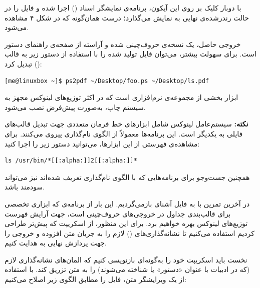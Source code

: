 با دوبار کلیک بر روی این آیکون، برنامه‌ی نمایشگر اسناد () اجرا شده و فایل را در حالت رندرشده‌ی نهایی به نمایش می‌گذارد؛ درست همان‌گونه که در شکل ۴ مشاهده می‌شود.


خروجی حاصل، یک نسخه‌ی حروف‌چینی شده و آراسته از صفحه‌ی راهنمای دستور  است. برای سهولت بیشتر، می‌توان فایل  تولید شده را با استفاده از دستور زیر به قالب  () تبدیل کرد:

\begin{latin}
\begin{lstlisting}
[me@linuxbox ~]$ ps2pdf ~/Desktop/foo.ps ~/Desktop/ls.pdf
\end{lstlisting}
\end{latin}

ابزار  بخشی از مجموعه‌ی نرم‌افزاری  است که در اکثر توزیع‌های لینوکس مجهز به سیستم چاپ، به‌صورت پیش‌فرض نصب می‌شود.

\begin{note}
\textbf{نکته:} سیستم‌عامل لینوکس شامل ابزارهای خط فرمان متعددی جهت تبدیل قالب‌های فایلی به یکدیگر است. این برنامه‌ها معمولاً از الگوی نام‌گذاری  پیروی می‌کنند. برای مشاهده‌ی فهرستی از این ابزارها، می‌توانید دستور زیر را اجرا کنید:
\begin{latin}
\begin{lstlisting}
ls /usr/bin/*[[:alpha:]]2[[:alpha:]]*
\end{lstlisting}
\end{latin}
همچنین جست‌وجو برای برنامه‌هایی که با الگوی نام‌گذاری  تعریف شده‌اند نیز می‌تواند سودمند باشد.
\end{note}

در آخرین تمرین با  به فایل آشنای  بازمی‌گردیم. این بار از برنامه‌ی  که ابزاری تخصصی برای قالب‌بندی جداول در خروجی‌های حروف‌چینی است، جهت آرایش فهرست توزیع‌های لینوکس بهره خواهیم برد. برای این منظور، از اسکریپت  که پیش‌تر طراحی کردیم استفاده می‌کنیم تا نشانه‌گذاری‌های () لازم را به جریان متن افزوده و خروجی را جهت پردازش نهایی به  هدایت کنیم.

نخست باید اسکریپت  خود را به‌گونه‌ای بازنویسی کنیم که المان‌های نشانه‌گذاری لازم (که در ادبیات  با عنوان «دستور» یا  شناخته می‌شوند) را به متن تزریق کند. با استفاده از یک ویرایشگر متن، فایل  را مطابق الگوی زیر اصلاح می‌کنیم:

